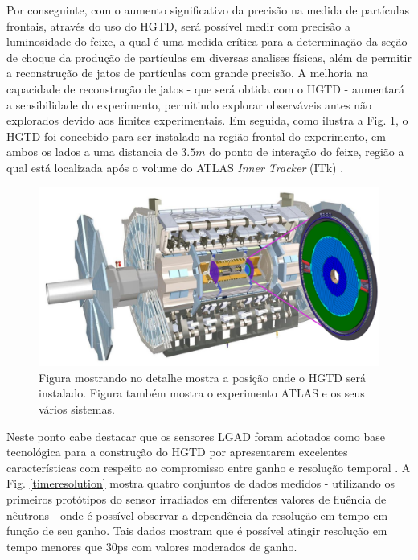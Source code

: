 Por conseguinte, com o aumento significativo da precisão na medida de partículas frontais, através do uso do HGTD, será possível medir com precisão a luminosidade do feixe, a qual é uma medida crítica para a determinação da seção de choque da produção de partículas em diversas analises físicas, além de  permitir a reconstrução de jatos de partículas com grande precisão. A melhoria na capacidade de reconstrução de jatos - que será obtida com o HGTD - aumentará a sensibilidade do experimento, permitindo explorar observáveis antes não explorados devido aos limites experimentais.
Em seguida, como ilustra a Fig. \ref{hgtd}, o HGTD foi concebido para ser instalado na região frontal do experimento, em ambos os lados a uma distancia de $3.5m$ do ponto de interação do feixe, região a qual está localizada após o volume do ATLAS {\it Inner Tracker} (ITk) \cite{tdr}. 

\begin{figure} 
    \centering
    \includegraphics[width=15.0cm]{assets/ATLAS_HGTD.png}
    \caption{ Figura mostrando no detalhe mostra a posição onde o HGTD será instalado. Figura também mostra o experimento ATLAS e os seus vários sistemas.}
    \label{hgtd}
\end{figure}

Neste ponto cabe destacar que os sensores LGAD foram adotados como base tecnológica para a construção do HGTD por apresentarem excelentes características com respeito ao compromisso entre ganho e resolução temporal \cite{tdr,JIN_LGAD,NIMA_LGAD,NIMA_LGAD_I,NIMA_LGAD_II,NIMA_LGAD_III}. A Fig. \ref{timeresolution} mostra quatro conjuntos de dados medidos - utilizando os primeiros protótipos do sensor irradiados em  diferentes valores de fluência de nêutrons - onde é possível observar a dependência da resolução em tempo em função de seu ganho. Tais dados mostram que é possível atingir resolução em tempo menores que 30ps com valores moderados de ganho.   


